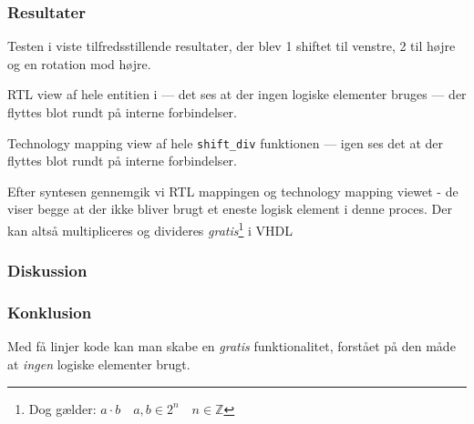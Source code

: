 \subsubsection{Resultater}
Testen i  viste tilfredsstillende resultater, der blev 1 shiftet til venstre, 2 til højre og en rotation mod højre.

{RTL view af hele entitien i  --- det ses at der ingen logiske elementer bruges --- der flyttes blot rundt på interne forbindelser.}


{Technology mapping view af hele \texttt{shift\_div} funktionen --- igen ses det at der flyttes blot rundt på interne forbindelser.}

Efter syntesen gennemgik vi RTL mappingen og technology mapping viewet - de viser begge at der ikke bliver brugt et eneste logisk element i denne proces. Der kan altså multipliceres og divideres \emph{gratis}\footnote{Dog gælder: $a\cdot b \quad a,b \in 2^n \quad n \in \mathbb{Z}$} i VHDL



\subsubsection{Diskussion}

\subsubsection{Konklusion}

Med få linjer kode kan man skabe en \emph{gratis} funktionalitet, forstået på den måde at \textit{ingen} logiske elementer brugt.

